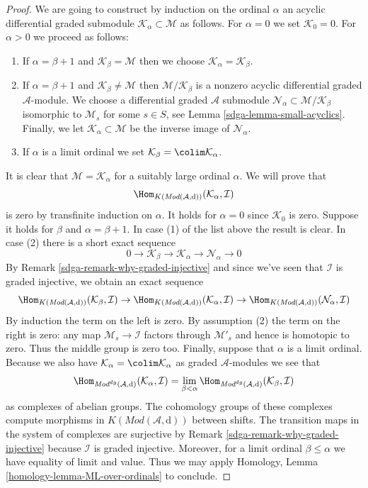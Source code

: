 \begin{proof}
\medskip\noindent
We are going to construct by induction on the ordinal $\alpha$
an acyclic differential graded submodule
$\mathcal{K}_\alpha \subset \mathcal{M}$ as follows.
For $\alpha = 0$ we set $\mathcal{K}_0 = 0$. For $\alpha > 0$
we proceed as follows:
\begin{enumerate}
\item If $\alpha = \beta + 1$ and $\mathcal{K}_\beta = \mathcal{M}$
then we choose $\mathcal{K}_\alpha = \mathcal{K}_\beta$.
\item If $\alpha = \beta + 1$ and $\mathcal{K}_\beta \not = \mathcal{M}$
then $\mathcal{M}/\mathcal{K}_\beta$ is a nonzero acyclic
differential graded $\mathcal{A}$-module.
We choose a differential graded $\mathcal{A}$ submodule
$\mathcal{N}_\alpha \subset \mathcal{M}/\mathcal{K}_\beta$
isomorphic to $\mathcal{M}_s$ for some $s \in S$, see
Lemma \ref{sdga-lemma-small-acyclics}.
Finally, we let $\mathcal{K}_\alpha \subset \mathcal{M}$
be the inverse image of $\mathcal{N}_\alpha$.
\item If $\alpha$ is a limit ordinal we set
$\mathcal{K}_\beta = \colim \mathcal{K}_\alpha$.
\end{enumerate}
It is clear that $\mathcal{M} = \mathcal{K}_\alpha$ for a suitably large
ordinal $\alpha$. We will prove that
$$
\Hom_{K(\textit{Mod}(\mathcal{A}, \text{d}))}(\mathcal{K}_\alpha, \mathcal{I})
$$
is zero by transfinite induction on $\alpha$. It holds for $\alpha = 0$
since $\mathcal{K}_0$ is zero. Suppose it holds for $\beta$ and
$\alpha = \beta + 1$. In case (1) of the list above the result is clear.
In case (2) there is a short exact sequence
$$
0 \to \mathcal{K}_\beta \to \mathcal{K}_\alpha \to \mathcal{N}_\alpha \to 0
$$
By Remark \ref{sdga-remark-why-graded-injective}
and since we've seen that $\mathcal{I}$ is graded
injective, we obtain an exact sequence
$$
\Hom_{K(\textit{Mod}(\mathcal{A}, \text{d}))}(\mathcal{K}_\beta, \mathcal{I})
\to
\Hom_{K(\textit{Mod}(\mathcal{A}, \text{d}))}(\mathcal{K}_\alpha, \mathcal{I})
\to
\Hom_{K(\textit{Mod}(\mathcal{A}, \text{d}))}(\mathcal{N}_\alpha, \mathcal{I})
$$
By induction the term on the left is zero. By assumption (2)
the term on the right is zero: any map $\mathcal{M}_s \to \mathcal{I}$
factors through $\mathcal{M}'_s$ and hence is homotopic to zero.
Thus the middle group is zero too. Finally, suppose that $\alpha$ is a
limit ordinal. Because we also have
$\mathcal{K}_\alpha = \colim \mathcal{K}_\alpha$ as graded
$\mathcal{A}$-modules we see that
$$
\Hom_{\textit{Mod}^{dg}(\mathcal{A}, \text{d})}
(\mathcal{K}_\alpha, \mathcal{I})
= \lim_{\beta < \alpha}
\Hom_{\textit{Mod}^{dg}(\mathcal{A}, \text{d})}
(\mathcal{K}_\beta, \mathcal{I})
$$
as complexes of abelian groups. The cohomology groups of these
complexes compute morphisms in $K(\textit{Mod}(\mathcal{A}, \text{d}))$
between shifts. The transition maps in the system of complexes
are surjective by Remark \ref{sdga-remark-why-graded-injective}
because $\mathcal{I}$ is graded injective.
Moreover, for a limit ordinal $\beta \leq \alpha$
we have equality of limit and value. Thus we may apply
Homology, Lemma \ref{homology-lemma-ML-over-ordinals}
to conclude.
\end{proof}

